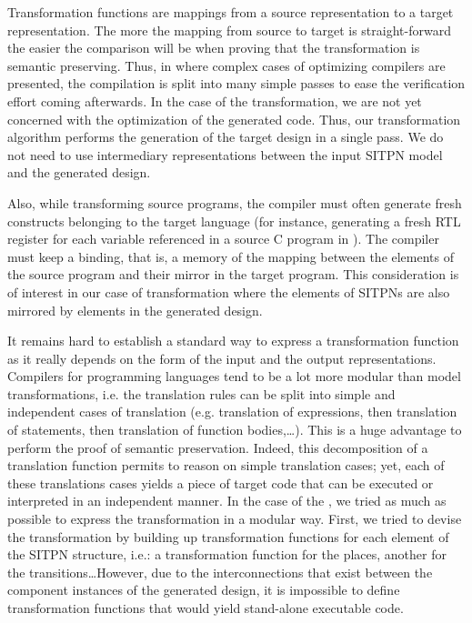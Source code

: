 \documentclass[pdflatex,sn-mathphys]{sn-jnl}%
\theoremstyle{thmstyleone}%
\theoremstyle{thmstyletwo}%
\theoremstyle{thmstylethree}%
\begin{document}
Transformation functions are mappings from a source representation to
a target representation. The more the mapping from source to target is
straight-forward the easier the comparison will be when proving that
the transformation is semantic preserving. Thus, in
\cite{Leroy2009,Tan,Chlipala2010} where complex cases of optimizing
compilers are presented, the compilation is split into many simple
passes to ease the verification effort coming afterwards. In the case
of the \hilecop{} transformation, we are not yet concerned with the
optimization of the generated \vhdl{} code. Thus, our transformation
algorithm performs the generation of the target \hvhdl{} design in a
single pass. We do not need to use intermediary representations
between the input SITPN model and the generated \hvhdl{} design.

Also, while transforming source programs, the compiler must often
generate fresh constructs belonging to the target language (for
instance, generating a fresh RTL register for each variable referenced
in a source C program in \cite{Leroy2009}). The compiler must keep a
binding, that is, a memory of the mapping between the elements of the
source program and their mirror in the target program. This
consideration is of interest in our case of transformation where the
elements of SITPNs are also mirrored by elements in the generated
\hvhdl{} design.

It remains hard to establish a standard way to express a
transformation function as it really depends on the form of the input
and the output representations. Compilers for programming languages
tend to be a lot more modular than model transformations, i.e. the
translation rules can be split into simple and independent cases of
translation (e.g.  translation of expressions, then translation of
statements, then translation of function bodies,\dots). This is a huge
advantage to perform the proof of semantic preservation. Indeed, this
decomposition of a translation function permits to reason on simple
translation cases; yet, each of these translations cases yields a
piece of target code that can be executed or interpreted in an
independent manner. In the case of the \hilecop{}, we tried as much as
possible to express the transformation in a modular way. First, we
tried to devise the transformation by building up transformation
functions for each element of the SITPN structure, i.e.: a
transformation function for the places, another for the
transitions\dots However, due to the interconnections that exist
between the component instances of the generated \hvhdl{} design, it
is impossible to define transformation functions that would yield
stand-alone executable code.
\end{document}

